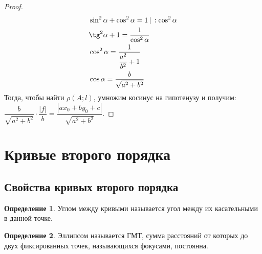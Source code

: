\documentclass[12pt]{article}
\theoremstyle{definition}
\newtheorem{definition}{Определение}
\begin{document}
\begin{proof}
    \begin{align*}
        &\sin^2\alpha+\cos^2\alpha=1\, | \, :\cos^2 \alpha\\
        &\tg^2\alpha+1=\frac{1}{\cos^2\alpha}\\
        &\cos^2\alpha=\frac{1}{\dfrac{a^2}{b^2}+1}\\
        &\cos \alpha = \frac{b}{\sqrt{a^2+b^2}}
    \end{align*}
    Тогда, чтобы найти $\rho(A;l)$, умножим косинус на гипотенузу и получим: $\dfrac{b}{\sqrt{a^2+b^2}} \cdot \dfrac{|f|}{b}=\dfrac{|ax_0+by_0+c|}{\sqrt{a^2+b^2}}$. 
    \end{proof}

    \section{Кривые второго порядка}
    \subsection{Свойства кривых второго порядка}

    \begin{definition}
        Углом между кривыми называется угол между их касательными в данной точке.
    \end{definition}

    \begin{definition}
        Эллипсом называется ГМТ, сумма расстояний от которых до двух фиксированных точек, называющихся фокусами, постоянна.
    \end{definition}

    \begin{center}
    \end{center}
\end{document}

